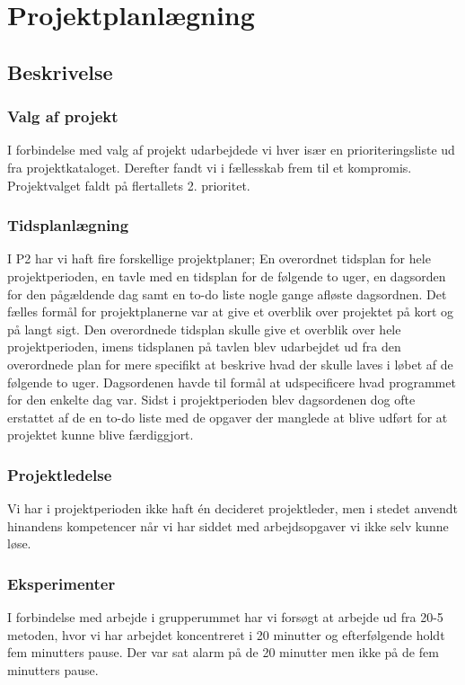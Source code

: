 \chapter{Projektplanlægning}

\section{Beskrivelse}

\subsection{Valg af projekt}
I forbindelse med valg af projekt udarbejdede vi hver især en prioriteringsliste ud fra projektkataloget. Derefter fandt vi i fællesskab frem til et kompromis. Projektvalget faldt på flertallets 2. prioritet.

\subsection{Tidsplanlægning}
I P2 har vi haft fire forskellige projektplaner; En overordnet tidsplan for hele projektperioden, en tavle med en tidsplan for de følgende to uger, en dagsorden for den pågældende dag samt en to-do liste nogle gange afløste dagsordnen. 
Det fælles formål for projektplanerne var at give et overblik over projektet på kort og på langt sigt.
Den overordnede tidsplan skulle give et overblik over hele projektperioden, imens tidsplanen på tavlen blev udarbejdet ud fra den overordnede plan for mere specifikt at beskrive hvad der skulle laves i løbet af de følgende to uger. Dagsordenen havde til formål at udspecificere hvad programmet for den enkelte dag var. Sidst i projektperioden blev dagsordenen dog ofte erstattet af de en to-do liste med de opgaver der manglede at blive udført for at projektet kunne blive færdiggjort.

\subsection{Projektledelse}
Vi har i projektperioden ikke haft én decideret projektleder, men i stedet anvendt hinandens kompetencer når vi har siddet med arbejdsopgaver vi ikke selv kunne løse.

\subsection{Eksperimenter}
I forbindelse med arbejde i grupperummet har vi forsøgt at arbejde ud fra 20-5 metoden, hvor vi har arbejdet koncentreret i 20 minutter og efterfølgende holdt fem minutters pause. Der var sat alarm på de 20 minutter men ikke på de fem minutters pause. 

